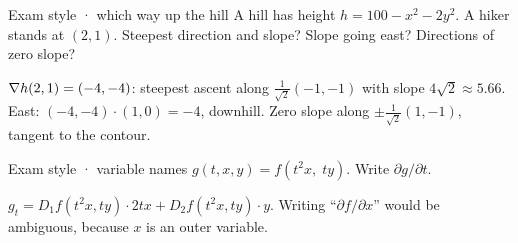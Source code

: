 \begin{problem}{Exam style · which way up the hill}
A hill has height $h=100-x^2-2y^2$. A hiker stands at $(2,1)$. Steepest direction and slope?
Slope going east? Directions of zero slope?
\end{problem}
\begin{solution}
$\nabla h(2,1)=(-4,-4)$: steepest ascent along $\frac1{\sqrt2}(-1,-1)$ with slope $4\sqrt2\approx5.66$.
East: $(-4,-4)\cdot(1,0)=-4$, downhill. Zero slope along $\pm\frac1{\sqrt2}(1,-1)$, tangent to the
contour.
\begin{center}
\end{center}
\end{solution}

\begin{problem}{Exam style · variable names}
$g(t,x,y)=f(t^2x,\;ty)$. Write $\partial g/\partial t$.
\end{problem}
\begin{solution}
$g_t=D_1f(t^2x,ty)\cdot2tx+D_2f(t^2x,ty)\cdot y$. Writing ``$\partial f/\partial x$'' would be ambiguous,
because $x$ is an outer variable.
\end{solution}

